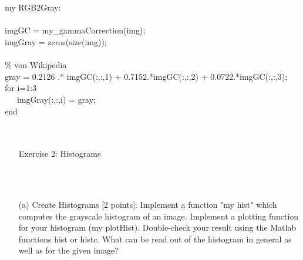         \\
        \\ \raggedright{ my RGB2Gray:
        \\\\ imgGC = my_gammaCorrection(img);
        \\ imgGray = zeros(size(img));
        \\
        \\ \% von Wikipedia
        \\ gray = 0.2126 .* imgGC(:,:,1) + 0.7152.*imgGC(:,:,2) + 0.0722.*imgGC(:,:,3);
        \\ for i=1:3
        \\ \ \ \ imgGray(:,:,i) = gray;
        \\ end
        }
        \\ \ \\
        \\ 
\pagebreak
    \begin{enumerate}
         \item[Exercise 2:] Histograms
    \end{enumerate}
    \\\\
    \begin{enumerate}        
        \item[(a)] {Create Histograms [2 points]: Implement a function "my hist" which computes the grayscale histogram of an image. Implement a plotting function for your histogram (my plotHist).
            Double-check your result using the Matlab functions hist or histc. What can be read out of the histogram  in general as well as for the given image?}
    \end{enumerate}
